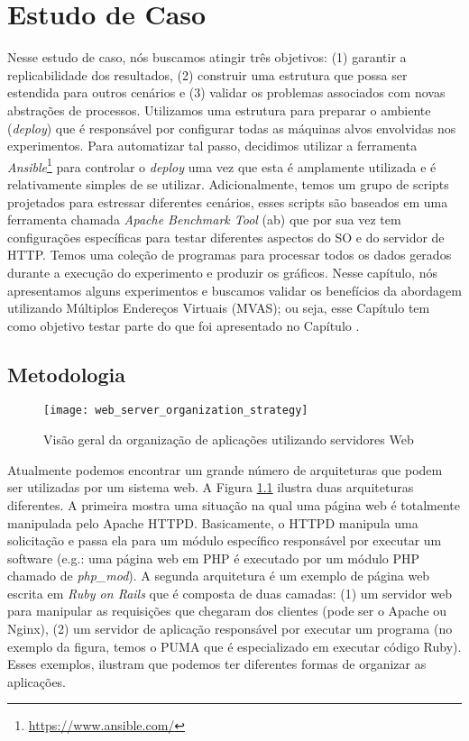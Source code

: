 \chapter{Estudo de Caso} \label{cap:estudo-de-caso}

Nesse estudo de caso, nós buscamos atingir três objetivos: (1) garantir a
replicabilidade dos resultados, (2) construir uma estrutura que possa ser
estendida para outros cenários e (3) validar os problemas associados com novas
abstrações de processos. Utilizamos uma estrutura para preparar o ambiente
(\emph{deploy}) que é responsável por configurar todas as máquinas alvos
envolvidas nos experimentos. Para automatizar tal passo, decidimos utilizar a
ferramenta \emph{Ansible}\footnote{\url{https://www.ansible.com/}} para
controlar o \emph{deploy} uma vez que esta é amplamente utilizada e é
relativamente simples de se utilizar. Adicionalmente, temos um grupo de scripts
projetados para estressar diferentes cenários, esses scripts são baseados em
uma ferramenta chamada \emph{Apache Benchmark Tool} (ab) que por sua vez tem
configurações específicas para testar diferentes aspectos do SO e do servidor
de HTTP. Temos uma coleção de programas para processar todos os dados gerados
durante a execução do experimento e produzir os gráficos. Nesse capítulo, nós
apresentamos alguns experimentos e buscamos validar os benefícios da abordagem
utilizando Múltiplos Endereços Virtuais (MVAS); ou seja, esse Capítulo tem como
objetivo testar parte do que foi apresentado no Capítulo
\label{cap:validacoes}.

\section{Metodologia} \label{sec:metodologia}

\begin{figure}[!h] \centering
\texttt{[image: web\_server\_organization\_strategy]}
\caption{Visão geral da organização de aplicações utilizando servidores Web}
\label{fig:web_server} \end{figure}

Atualmente podemos encontrar um grande número de arquiteturas que podem ser
utilizadas por um sistema web. A Figura \ref{fig:web_server} ilustra duas
arquiteturas diferentes. A primeira mostra uma situação na qual uma página web
é totalmente manipulada pelo Apache HTTPD. Basicamente, o HTTPD manipula uma
solicitação e passa ela para um módulo específico responsável por executar um
software (e.g.: uma página web em PHP é executado por um módulo PHP chamado de
\emph{php\_mod}). A segunda arquitetura é um exemplo de página web escrita em
\emph{Ruby on Rails} que é composta de duas camadas: (1) um servidor web para
manipular as requisições que chegaram dos clientes (pode ser o Apache ou
Nginx), (2) um servidor de aplicação responsável por executar um programa (no
exemplo da figura, temos o PUMA que é especializado em executar código Ruby).
Esses exemplos, ilustram que podemos ter diferentes formas de organizar as
aplicações.

